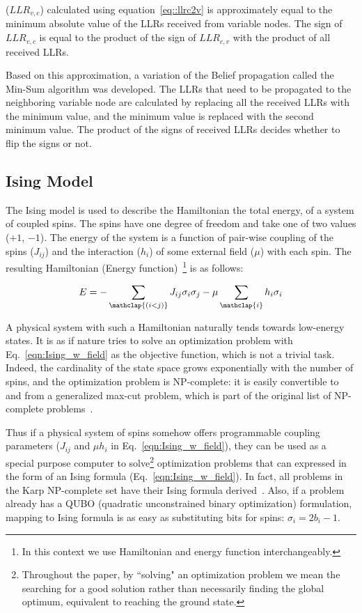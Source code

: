 ($LLR_{v,c}$) calculated using equation~\ref{eq::llrc2v} is approximately equal to the minimum absolute value of the LLRs received from variable nodes. The sign of $LLR_{v,c}$ is equal to the product of the sign of $LLR_{c,v}$ with the product of all received LLRs. 

Based on this approximation, a variation of the Belief propagation called the Min-Sum algorithm was developed. The LLRs that need to be propagated to the neighboring variable node are calculated by replacing all the received LLRs with the minimum value, and the minimum value is replaced with the second minimum value. The product of the signs of received LLRs decides whether to flip the signs or not.

\subsection{Ising Model}\label{sec:ising_mode}
The Ising model is used to describe the Hamiltonian \ie the total energy, of a system of coupled
spins. The spins have one degree of freedom and take one of two values ($+1$,
$-1$). The energy of the system is a function of pair-wise coupling of the
spins ($J_{ij}$) and the interaction ($h_i$)
of some external field ($\mu$) with each
spin. The resulting Hamiltonian (Energy function)~\footnote{In this context we use Hamiltonian and energy function interchangeably.} is as follows:

\begin{equation}
\label{eqn:Ising_w_field}
E = -\sum_{\mathclap{(i<j)}} J_{ij}\sigma_i\sigma_j - \mu \sum_{\mathclap{i}} h_i\sigma_i
\end{equation}


A physical system with such a Hamiltonian naturally tends towards low-energy
states. It is as if nature tries to solve an optimization problem with
Eq.~\ref{eqn:Ising_w_field} as the objective function, which is not a trivial
task. Indeed, the cardinality of the state space grows exponentially with the
number of spins, and the optimization problem is NP-complete: it is easily
convertible to and from a generalized max-cut problem, which is part of the
original list of NP-complete problems~\cite{Karp1972}.

Thus if a physical system of spins somehow offers programmable coupling
parameters ($J_{ij}$ and $\mu h_i$ in Eq.~\ref{eqn:Ising_w_field}), they can
be used as a special purpose computer to solve\footnote{Throughout
the paper, by ``solving" an optimization problem we mean the
searching for a good solution rather than necessarily finding the global optimum, 
equivalent to reaching the ground state.} optimization problems that
can expressed in the form of an Ising formula (Eq.~\ref{eqn:Ising_w_field}). In fact, all
problems in the Karp NP-complete set have their Ising formula
derived~\cite{lucas2014ising}. Also, if a problem already has a QUBO (quadratic
unconstrained binary optimization) formulation, mapping to Ising formula is as
easy as substituting bits for spins: $\sigma_i = 2b_i-1$.

